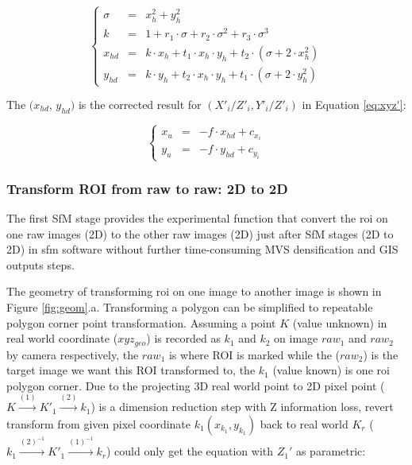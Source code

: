 \documentclass{configs/bmcart}
\begin{document}
$$
  \left\{\begin{array}{lll}
    \sigma & = & x_h^2 + y_h^2 \\
    k      & = & 1 + r_1 \cdot \sigma + r_2 \cdot \sigma^2 + r_3 \cdot \sigma^3 \\
    x_{hd} & = & k \cdot x_h + t_1 \cdot x_h \cdot y_h + t_2 \cdot (\sigma + 2 \cdot x_h^2) \\
    y_{hd} & = & k \cdot y_h + t_2 \cdot x_h \cdot y_h + t_1 \cdot (\sigma + 2 \cdot y_h^2)
  \end{array} \right. \nonumber
$$

The $(x_{hd}$, $y_{hd})$ is the corrected result for $(X'_i / Z'_i, Y'_i / Z'_i)$ in Equation \ref{eq:xyz'}:

$$
\left\{
  \begin{array}{lll}
    x_u & = & - f \cdot x_{hd} + c_{x_i} \\
    y_u & = & - f \cdot y_{hd} + c_{y_i}
  \end{array} 
\right.
$$

\subsubsection*{Transform ROI from raw to raw: 2D to 2D}
The first SfM stage provides the experimental function that convert the \acrshort*{roi} on one raw images (2D) to the other raw images (2D) just after SfM stages (2D to 2D) in \acrshort*{sfm} software without further time-consuming MVS densification and GIS outputs steps.

The geometry of transforming \acrshort*{roi} on one image to another image is shown in Figure \ref{fig:geom}.a. Transforming a polygon can be simplified to repeatable polygon corner point transformation. Assuming a point $K$ (value unknown) in real world coordinate ($xyz_{geo}$) is recorded as $k_1$ and $k_2$ on image $raw_1$ and $raw_2$ by camera respectively, the $raw_1$ is where ROI is marked while the ($raw_2$) is the target image we want this ROI transformed to, the $k_1$ (value known) is one \acrshort*{roi} polygon corner. Due to the projecting 3D real world point to 2D pixel point ($K \xrightarrow{(1)} K'_1 \xrightarrow{(2)} k_1$) is a dimension reduction step with Z information loss, revert transform from given pixel coordinate $k_1 (x_{k_1}, y_{k_1})$ back to real world $K_r$ ($k_1 \xrightarrow{(2)^{-1}} K'_1 \xrightarrow{(1)^{-1}} k_r$) could only get the equation with $Z_1'$ as parametric:
\end{document}

